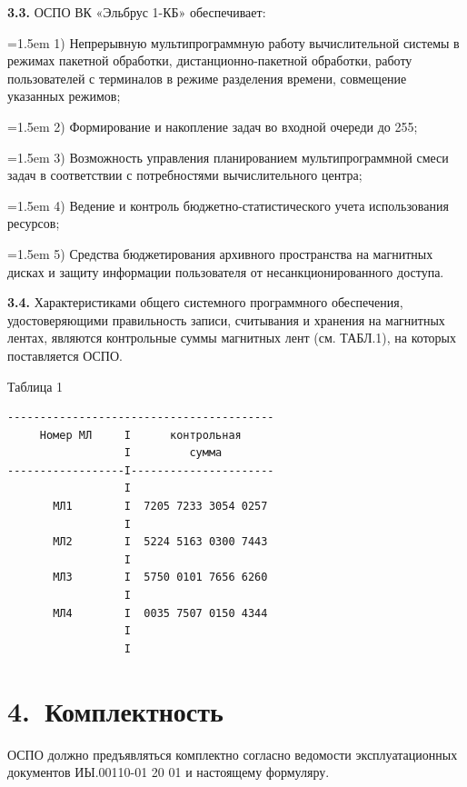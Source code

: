 \documentclass[11pt,a4paper]{article}
\begin{document}
\par\textbf{3.3.} ОСПО ВК «Эльбрус 1-КБ» обеспечивает:\par
\par\hangindent=1.5em 1) Непрерывную мультипрограммную работу вычислительной системы в режимах пакетной обработки, дистанционно-пакетной обработки, работу пользователей с терминалов в режиме разделения времени, совмещение указанных режимов;\par
\par\hangindent=1.5em 2) Формирование и накопление задач во входной очереди до 255;\par
\par\hangindent=1.5em 3) Возможность управления планированием мультипрограммной смеси задач в соответствии с потребностями вычислительного центра;\par
\par\hangindent=1.5em 4) Ведение и контроль бюджетно-статистического учета использования ресурсов;\par
\par\hangindent=1.5em 5) Средства бюджетирования архивного пространства на магнитных дисках и защиту информации пользователя от несанкционированного доступа.\par
\par\textbf{3.4.} Характеристиками общего системного программного обеспечения, удостоверяющими правильность записи, считывания и хранения на магнитных лентах, являются контрольные суммы магнитных лент (см. ТАБЛ.1), на которых поставляется ОСПО.\par
\begin{flushright}\small Таблица 1\end{flushright}
\begin{center}\small
\begin{BVerbatim}
-----------------------------------------
     Номер МЛ     I      контрольная
                  I         сумма
------------------I----------------------
                  I
       МЛ1        I  7205 7233 3054 0257
                  I
       МЛ2        I  5224 5163 0300 7443
                  I
       МЛ3        I  5750 0101 7656 6260
                  I
       МЛ4        I  0035 7507 0150 4344
                  I
                  I
\end{BVerbatim}
\end{center}

\section*{4.~Комплектность}
ОСПО должно предъявляться комплектно согласно ведомости эксплуатационных документов ИЫ.00110-01 20 01 и настоящему формуляру.
\end{document}
